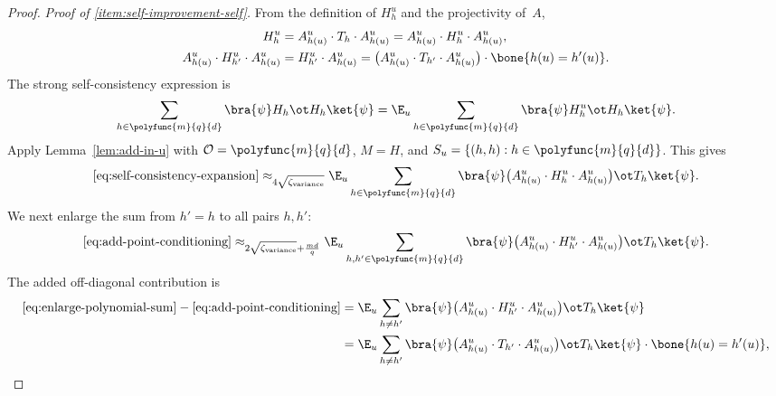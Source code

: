 \begin{proof}
  \emph{Proof of \ref{item:self-improvement-self}.}
  From the definition of $H_h^u$ and the projectivity of~$A$,
  \begin{align}
    H^u_h &= A^u_{h(u)} \cdot T_h \cdot A^u_{h(u)} = A^u_{h(u)} \cdot H^u_h \cdot A^u_{h(u)}, \label{eq:h-sandwich}\\
    A^u_{h(u)} \cdot H^u_{h'} \cdot A^u_{h(u)} &= H^u_{h'} \cdot A^u_{h(u)} = \bigl(A^u_{h(u)} \cdot T_{h'} \cdot A^u_{h(u)}\bigr)\cdot \bone{h(u) = h'(u)}. \label{eq:h-blt}
  \end{align}
  The strong self-consistency expression is
  \begin{equation}\label{eq:self-consistency-expansion}
    \sum_{h\in\polyfunc{m}{q}{d}} \bra{\psi} H_h \ot H_h \ket{\psi}
    = \E_{u} \sum_{h \in \polyfunc{m}{q}{d}} \bra{\psi} H_h^{u} \ot H_h \ket{\psi}.
  \end{equation}
  Apply Lemma~\ref{lem:add-in-u} with $\mathcal O=\polyfunc{m}{q}{d}$, $M=H$, and $S_u=\{(h,h):h\in\polyfunc{m}{q}{d}\}$. This gives
  \begin{equation}\label{eq:add-point-conditioning}
    \eqref{eq:self-consistency-expansion}
    \approx_{4 \sqrt{\zeta_{\mathrm{variance}}}}
    \E_{u} \sum_{h \in \polyfunc{m}{q}{d}} \bra{\psi} \bigl(A^{u}_{h(u)} \cdot H_h^{u} \cdot A^{u}_{h(u)}\bigr) \ot T_h \ket{\psi}.
  \end{equation}
  We next enlarge the sum from $h'=h$ to all pairs $h,h'$:
  \begin{equation}\label{eq:enlarge-polynomial-sum}
    \eqref{eq:add-point-conditioning}
    \approx_{2\sqrt{\zeta_{\mathrm{variance}}} + \frac{md}{q}}
    \E_{u} \sum_{h, h' \in \polyfunc{m}{q}{d}} \bra{\psi} \bigl(A^{u}_{h(u)} \cdot H^{u}_{h'} \cdot A^{u}_{h(u)}\bigr) \ot T_h \ket{\psi}.
  \end{equation}
  The added off-diagonal contribution is
  \begin{align}
    \eqref{eq:enlarge-polynomial-sum}-\eqref{eq:add-point-conditioning}
    &= \E_{u} \sum_{h \neq h'} \bra{\psi} \bigl(A^{u}_{h(u)} \cdot H^{u}_{h'} \cdot A^{u}_{h(u)}\bigr) \ot T_h \ket{\psi} \notag\\
    &= \E_{u} \sum_{h \neq h'} \bra{\psi} \bigl(A^{u}_{h(u)} \cdot T_{h'} \cdot A^{u}_{h(u)}\bigr) \ot T_h \ket{\psi} \cdot \bone{h(u) = h'(u)}, \label{eq:added-indicator}

\end{align}
\end{proof}
